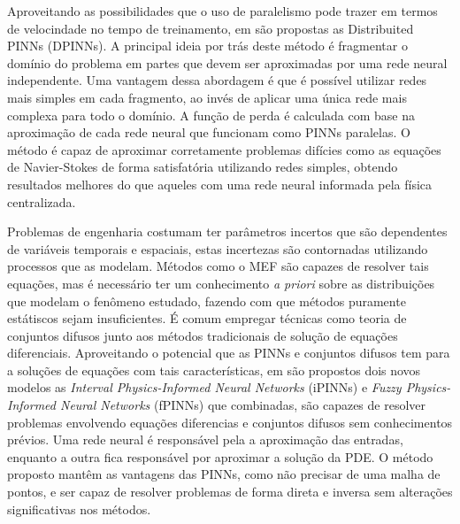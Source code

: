 Aproveitando as possibilidades que o uso de paralelismo pode trazer em termos 
de velocindade no tempo de treinamento, em \cite{dwivedi:2019-distributed-pinns}
são propostas as Distribuited PINNs (DPINNs). A principal ideia por trás deste método
é fragmentar o domínio do problema em partes que devem ser aproximadas por uma rede
neural independente. Uma vantagem dessa abordagem é que é possível utilizar redes
mais simples em cada fragmento, ao invés de aplicar uma única rede mais complexa
para todo o domínio. A função de perda é calculada com base na aproximação de cada
rede neural que funcionam como PINNs paralelas. O método é capaz de aproximar 
corretamente problemas difícies como as equações de Navier-Stokes de forma satisfatória
utilizando redes simples, obtendo resultados melhores do que aqueles com uma
rede neural informada pela física centralizada.

Problemas de engenharia costumam ter parâmetros incertos que são dependentes 
de variáveis temporais e espaciais, estas incertezas são contornadas utilizando
processos que as modelam.
Métodos como o MEF são capazes de resolver tais equações, mas é necessário ter um
conhecimento \textit{a priori} sobre as distribuições que modelam o fenômeno estudado,
fazendo com que métodos puramente estátiscos sejam insuficientes.
É comum empregar técnicas como teoria de conjuntos difusos junto aos métodos 
tradicionais de solução de equações diferenciais.
Aproveitando o potencial que as PINNs e conjuntos difusos tem para a soluções 
de equações com tais características, em \cite{fugh-etal:2022-fuzzy-pinns} 
são propostos dois novos modelos as 
\textit{Interval Physics-Informed Neural Networks} (iPINNs) e 
\textit{Fuzzy Physics-Informed Neural Networks} (fPINNs) que combinadas, 
são capazes de resolver problemas envolvendo equações diferencias e conjuntos 
difusos sem conhecimentos prévios. Uma rede neural é responsável pela a aproximação 
das entradas, enquanto a outra fica responsável por aproximar a solução da PDE.  
O método proposto mantêm as vantagens das PINNs, como não precisar de uma 
malha de pontos, e ser capaz de resolver problemas de forma direta e inversa
sem alterações significativas nos métodos.

